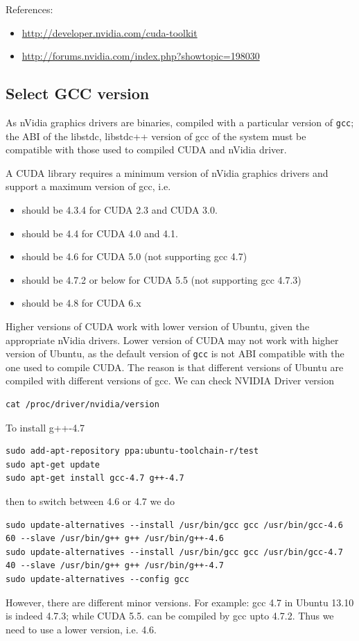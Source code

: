 References:
\begin{itemize}
  \item \url{http://developer.nvidia.com/cuda-toolkit}
  \item \url{http://forums.nvidia.com/index.php?showtopic=198030}
\end{itemize}

\subsection{Select GCC version}
\label{sec:gcc_version}

As nVidia graphics drivers are binaries, compiled with a particular version of
\verb!gcc!; the ABI of the libstdc, libstdc++ version of gcc of the system must
be compatible with those used to compiled CUDA and nVidia driver. 

A CUDA library requires a minimum version of nVidia graphics drivers and support
a maximum version of gcc, i.e.
\begin{itemize}
  \item should be 4.3.4 for CUDA 2.3 and CUDA 3.0.
  \item should be 4.4 for CUDA 4.0 and 4.1.
  \item should be 4.6 for CUDA 5.0 (not supporting gcc 4.7)
  \item should be 4.7.2 or below for CUDA 5.5 (not supporting gcc 4.7.3)
  \item should be 4.8 for CUDA 6.x
\end{itemize}

\begin{framed}
Higher versions of CUDA work with lower version of Ubuntu, given the
appropriate nVidia drivers. Lower version of CUDA may not work with
higher version of Ubuntu, as the default version of \verb!gcc! is not
ABI compatible with the one used to compile CUDA. The reason is that different
versions of Ubuntu are compiled with different versions of gcc.
We can check NVIDIA Driver version
\begin{verbatim}
cat /proc/driver/nvidia/version 
\end{verbatim}
\end{framed}


To install g++-4.7
\begin{verbatim}
sudo add-apt-repository ppa:ubuntu-toolchain-r/test
sudo apt-get update
sudo apt-get install gcc-4.7 g++-4.7
\end{verbatim}

then to switch between 4.6 or 4.7 we do
\begin{verbatim}
sudo update-alternatives --install /usr/bin/gcc gcc /usr/bin/gcc-4.6 60 --slave /usr/bin/g++ g++ /usr/bin/g++-4.6 
sudo update-alternatives --install /usr/bin/gcc gcc /usr/bin/gcc-4.7 40 --slave /usr/bin/g++ g++ /usr/bin/g++-4.7 
sudo update-alternatives --config gcc
\end{verbatim}
However, there are different minor versions. For example: gcc 4.7 in Ubuntu
13.10 is indeed 4.7.3; while CUDA 5.5. can be compiled by gcc upto 4.7.2. Thus
we need to use a lower version, i.e. 4.6.

